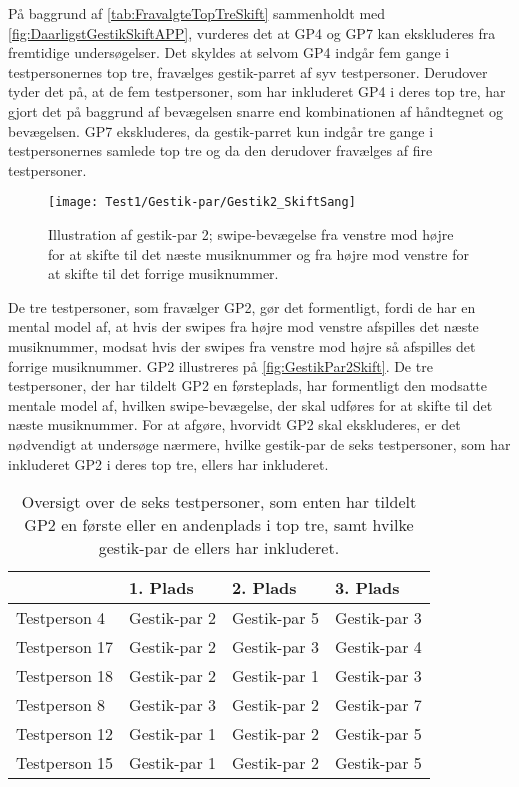 \noindent
%
På baggrund af \autoref{tab:FravalgteTopTreSkift} sammenholdt med \autoref{fig:DaarligstGestikSkiftAPP}, vurderes det at GP4 og GP7 kan ekskluderes fra fremtidige undersøgelser. Det skyldes at selvom GP4 indgår fem gange i testpersonernes top tre, fravælges gestik-parret af syv testpersoner. Derudover tyder det på, at de fem testpersoner, som har inkluderet GP4 i deres top tre, har gjort det på baggrund af bevægelsen snarre end kombinationen af håndtegnet og bevægelsen. GP7 ekskluderes, da gestik-parret kun indgår tre gange i testpersonernes samlede top tre og da den derudover fravælges af fire testpersoner. 
%
\begin{figure}[H]
	\centering
	\texttt{[image: Test1/Gestik-par/Gestik2\_SkiftSang]}
	\caption{Illustration af gestik-par 2; swipe-bevægelse fra venstre mod højre for at skifte til det næste musiknummer og fra højre mod venstre for at skifte til det forrige musiknummer.}
	\label{fig:GestikPar2Skift}
\end{figure}
\noindent
%
De tre testpersoner, som fravælger GP2, gør det formentligt, fordi de har en mental model af, at hvis der swipes fra højre mod venstre afspilles det næste musiknummer, modsat hvis der swipes fra venstre mod højre så afspilles det forrige musiknummer. GP2 illustreres på \autoref{fig:GestikPar2Skift}. De tre testpersoner, der har tildelt GP2 en førsteplads, har formentligt den modsatte mentale model af, hvilken swipe-bevægelse, der skal udføres for at skifte til det næste musiknummer. For at afgøre, hvorvidt GP2 skal ekskluderes, er det nødvendigt at undersøge nærmere, hvilke gestik-par de seks testpersoner, som har inkluderet GP2 i deres top tre, ellers har inkluderet. 
%
\begin{table}[H]
	\centering
	\begin{tabular}{ | p{3cm} | p{3cm} | p{3cm} | p{3cm} |}
	\hline
		 & 1. Plads & 2. Plads & 3. Plads \\ \hline
		Testperson 4 & Gestik-par 2 & Gestik-par 5 & Gestik-par 3 \\ \hline
		Testperson 17 & Gestik-par 2 & Gestik-par 3 & Gestik-par 4 \\ \hline
		Testperson 18 & Gestik-par 2 & Gestik-par 1 & Gestik-par 3 \\ \hline
		Testperson 8 & Gestik-par 3 & Gestik-par 2 & Gestik-par 7 \\ \hline
		Testperson 12 & Gestik-par 1 & Gestik-par 2 & Gestik-par 5\\ \hline
		Testperson 15 & Gestik-par 1 & Gestik-par 2 & Gestik-par 5 \\ \hline
	\end{tabular}
	\caption{Oversigt over de seks testpersoner, som enten har tildelt GP2 en første eller en andenplads i top tre, samt hvilke gestik-par de ellers har inkluderet.}
	\label{tab:GestikPar2ITopTre}
\end{table}
